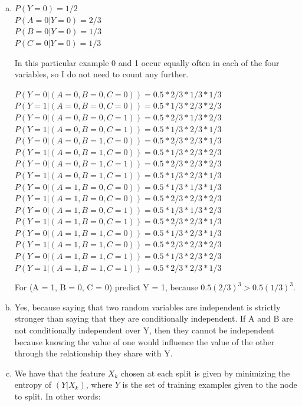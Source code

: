 \documentclass{article}
\begin{document}
\section{}
\begin{enumerate}[(a)]
\item

$P(Y = 0) = 1/2$ \\
$P(A = 0 | Y = 0) = 2/3$ \\
$P(B = 0 | Y = 0) = 1/3$ \\
$P(C = 0 | Y = 0) = 1/3$ \\

\vspace{6pt}

In this particular example 0 and 1 occur equally often in each of the four
variables, so I do not need to count any further.

\vspace{6pt}

$P(Y = 0| (A=0,B=0,C=0)) = 0.5 * 2/3 * 1/3 * 1/3$
$P(Y = 1| (A=0,B=0,C=0)) = 0.5 * 1/3 * 2/3 * 2/3$
$P(Y = 0| (A=0,B=0,C=1)) = 0.5 * 2/3 * 1/3 * 2/3$
$P(Y = 1| (A=0,B=0,C=1)) = 0.5 * 1/3 * 2/3 * 1/3$
$P(Y = 0| (A=0,B=1,C=0)) = 0.5 * 2/3 * 2/3 * 1/3$
$P(Y = 1| (A=0,B=1,C=0)) = 0.5 * 1/3 * 2/3 * 2/3$
$P(Y = 0| (A=0,B=1,C=1)) = 0.5 * 2/3 * 2/3 * 2/3$
$P(Y = 1| (A=0,B=1,C=1)) = 0.5 * 1/3 * 2/3 * 1/3$
$P(Y = 0| (A=1,B=0,C=0)) = 0.5 * 1/3 * 1/3 * 1/3$
$P(Y = 1| (A=1,B=0,C=0)) = 0.5 * 2/3 * 2/3 * 2/3$
$P(Y = 0| (A=1,B=0,C=1)) = 0.5 * 1/3 * 1/3 * 2/3$
$P(Y = 1| (A=1,B=0,C=1)) = 0.5 * 2/3 * 2/3 * 1/3$
$P(Y = 0| (A=1,B=1,C=0)) = 0.5 * 1/3 * 2/3 * 1/3$
$P(Y = 1| (A=1,B=1,C=0)) = 0.5 * 2/3 * 2/3 * 2/3$
$P(Y = 0| (A=1,B=1,C=1)) = 0.5 * 1/3 * 2/3 * 2/3$
$P(Y = 1| (A=1,B=1,C=1)) = 0.5 * 2/3 * 2/3 * 1/3$

\vspace{6pt}

For (A = 1, B = 0, C = 0) predict Y = 1, because $0.5(2/3)^3 > 0.5(1/3)^3$.

\item
Yes, because saying that two random variables are independent is strictly
stronger than saying that they are conditionally independent. If A and B are
not conditionally independent over Y, then they cannot be independent because
knowing the value of one would influence the value of the other through the
relationship they share with Y.

\item
We have that the feature $X_k$ chosen at each split is given by minimizing the
entropy of $(Y|X_k)$, where $Y$ is the set of training examples given to the
node to split. In other words:


\end{enumerate}
\end{document}

